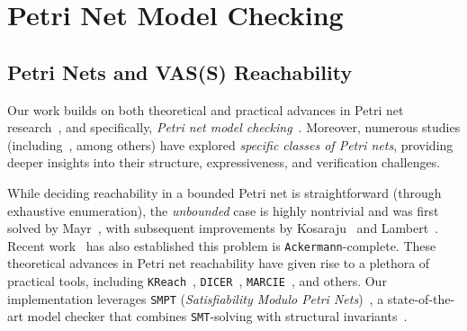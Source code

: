 \clearpage

\section{Petri Net Model Checking}
\label{appendix:smpt}


\subsection{Petri Nets and VAS(S) Reachability}
	
	Our work builds on both theoretical and practical advances in 
Petri net research~\cite{Mu89,Es96,Re12,EsNi24}, and specifically, \textit{Petri net model checking}~\cite{DuLaSr25,HuScReAb17,AmBeDo14,PiHaRe20,Wo18}.
Moreover, numerous studies (including~\cite{LiWaChSuZh02,Zu91,AkChDaJaSa17,AnPePe13}, among others) have explored \textit{specific classes of Petri nets}, providing deeper insights into their structure, expressiveness, and verification challenges.
	
	
	\medskip
	While deciding reachability in a bounded Petri net is straightforward (through exhaustive enumeration), the \textit{unbounded} case is highly nontrivial and was first solved by 
	Mayr~\cite{Ma81}, with subsequent improvements by Kosaraju~\cite{Ko82} and 
	Lambert~\cite{La92}. Recent work~\cite{CzWo22} has also established this 
	problem is \texttt{Ackermann}-complete.
	These theoretical advances in Petri net reachability have given rise to a 
	plethora of practical tools, including \texttt{KReach}~\cite{DiLa20}, 
	\texttt{DICER}~\cite{XiZhLi21}, \texttt{MARCIE}~\cite{HeRoSc13}, and others. 
	Our implementation leverages \texttt{SMPT} (\emph{Satisfiability Modulo Petri Nets})~\cite{AmDa23}, a state-of-the-art model checker that combines \texttt{SMT}-solving with structural invariants~\cite{AmBeDa21,AmDaHu22}.
	

